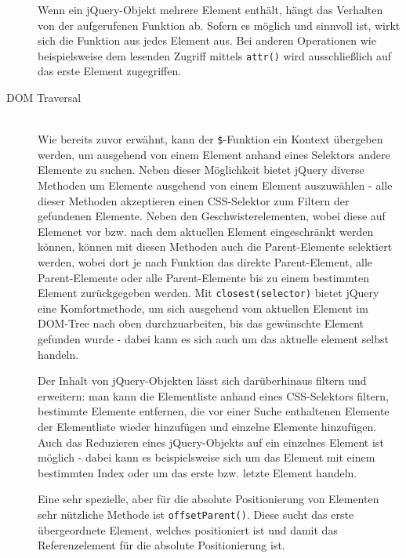 \begin{description}
Wenn ein jQuery-Objekt mehrere Element enthält, hängt das Verhalten von der aufgerufenen Funktion
ab. Sofern es möglich und sinnvoll ist, wirkt sich die Funktion aus jedes Element aus. Bei anderen
Operationen wie beispielsweise dem lesenden Zugriff mittels \lstinline{attr()} wird ausschließlich
auf das erste Element zugegriffen.

\item[DOM Traversal] \hfill \\
Wie bereits zuvor erwähnt, kann der \lstinline{$}-Funktion ein Kontext übergeben werden, um
ausgehend von einem Element anhand eines Selektors andere Elemente zu suchen. Neben dieser
Möglichkeit bietet jQuery diverse Methoden um Elemente ausgehend von einem Element auszuwählen -
alle dieser Methoden akzeptieren einen CSS-Selektor zum Filtern der gefundenen Elemente. Neben den
Geschwisterelementen, wobei diese auf Elemenet vor bzw. nach dem aktuellen Element eingeschränkt
werden können, können mit diesen Methoden auch die Parent-Elemente selektiert werden, wobei dort je
nach Funktion das direkte Parent-Element, alle Parent-Elemente oder alle Parent-Elemente bis zu
einem bestimmten Element zurückgegeben werden. Mit \lstinline{closest(selector)} bietet jQuery eine
Komfortmethode, um sich ausgehend vom aktuellen Element im DOM-Tree nach oben durchzuarbeiten, bis
das gewünschte Element gefunden wurde - dabei kann es sich auch um das aktuelle element selbst
handeln.

Der Inhalt von jQuery-Objekten lässt sich darüberhinaus filtern und erweitern: man kann die
Elementliste anhand eines CSS-Selektors filtern, bestimmte Elemente entfernen, die vor einer
Suche enthaltenen Elemente der Elementliste wieder hinzufügen und einzelne Elemente hinzufügen. Auch
das Reduzieren eines jQuery-Objekts auf ein einzelnes Element ist möglich - dabei kann es
beispielsweise sich um das Element mit einem bestimmten Index oder um das erste bzw. letzte Element
handeln.

Eine sehr spezielle, aber für die absolute Positionierung von Elementen sehr nützliche Methode ist
\lstinline{offsetParent()}. Diese sucht das erste übergeordnete Element, welches positioniert ist
und damit das Referenzelement für die absolute Positionierung ist.


\end{description}

